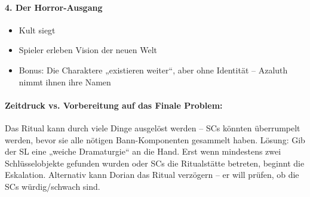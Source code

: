 \paragraph{4. Der Horror-Ausgang}
\begin{itemize}
\item Kult siegt
\item Spieler erleben Vision der neuen Welt
\item Bonus: Die Charaktere „existieren weiter“, aber ohne Identität – Azaluth nimmt ihnen ihre Namen
\end{itemize}
\paragraph{Zeitdruck vs. Vorbereitung auf das Finale Problem:} Das Ritual kann durch viele Dinge ausgelöst werden – SCs könnten überrumpelt werden, bevor sie alle nötigen Bann-Komponenten gesammelt haben. Lösung: Gib der SL eine „weiche Dramaturgie“ an die Hand. Erst wenn mindestens zwei Schlüsselobjekte gefunden wurden oder SCs die Ritualstätte betreten, beginnt die Eskalation. Alternativ kann Dorian das Ritual verzögern – er will prüfen, ob die SCs würdig/schwach sind.

